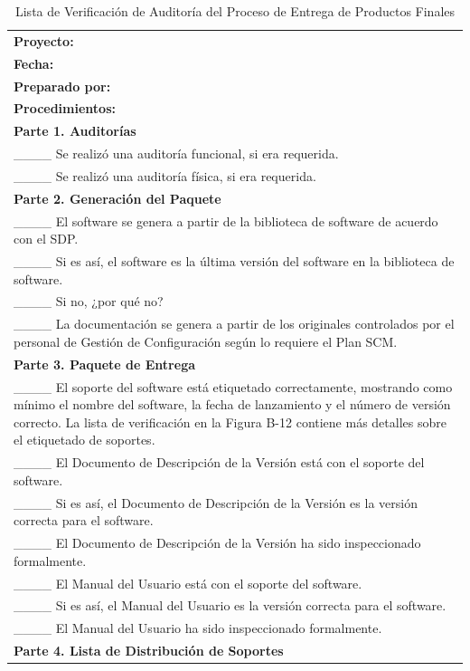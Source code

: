 \begin{table}[H]
\centering
\caption{Lista de Verificación de Auditoría del Proceso de Entrega de Productos Finales}
\label{fig:b10}
\begin{tabular}{|p{14cm}|}
\hline
\textbf{Proyecto:} \\
\textbf{Fecha:} \\
\textbf{Preparado por:} \\
\hline
\textbf{Procedimientos:} \\
\textbf{Parte 1. Auditorías} \\
\_\_\_\_ Se realizó una auditoría funcional, si era requerida. \\
\_\_\_\_ Se realizó una auditoría física, si era requerida. \\
\textbf{Parte 2. Generación del Paquete} \\
\_\_\_\_ El software se genera a partir de la biblioteca de software de acuerdo con el SDP. \\
\_\_\_\_ Si es así, el software es la última versión del software en la biblioteca de software. \\
\_\_\_\_ Si no, ¿por qué no? \\
\_\_\_\_ La documentación se genera a partir de los originales controlados por el personal de Gestión de Configuración según lo requiere el Plan SCM. \\
\textbf{Parte 3. Paquete de Entrega} \\
\_\_\_\_ El soporte del software está etiquetado correctamente, mostrando como mínimo el nombre del software, la fecha de lanzamiento y el número de versión correcto. La lista de verificación en la Figura B-12 contiene más detalles sobre el etiquetado de soportes. \\
\_\_\_\_ El Documento de Descripción de la Versión está con el soporte del software. \\
\_\_\_\_ Si es así, el Documento de Descripción de la Versión es la versión correcta para el software. \\
\_\_\_\_ El Documento de Descripción de la Versión ha sido inspeccionado formalmente. \\
\_\_\_\_ El Manual del Usuario está con el soporte del software. \\
\_\_\_\_ Si es así, el Manual del Usuario es la versión correcta para el software. \\
\_\_\_\_ El Manual del Usuario ha sido inspeccionado formalmente. \\
\textbf{Parte 4. Lista de Distribución de Soportes} \\

\end{tabular}
\end{table}
